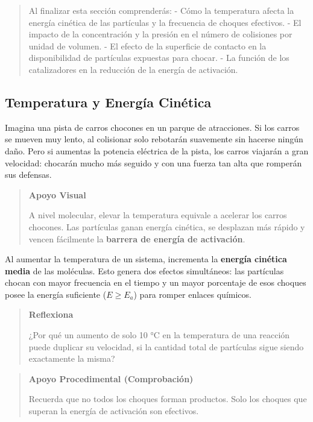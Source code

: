 \documentclass[
  spanish,
  letterpaper,
  12pt,
  oneside,
  open=any,
  DIV=15]{scrbook}
\begin{document}
\begin{tcolorbox}
\begin{quote}
Al finalizar esta sección comprenderás: - Cómo la temperatura afecta la
energía cinética de las partículas y la frecuencia de choques efectivos.
- El impacto de la concentración y la presión en el número de colisiones
por unidad de volumen. - El efecto de la superficie de contacto en la
disponibilidad de partículas expuestas para chocar. - La función de los
catalizadores en la reducción de la energía de activación.
\end{quote}

\subsection{Temperatura y Energía
Cinética}\label{temperatura-y-energuxeda-cinuxe9tica}

Imagina una pista de carros chocones en un parque de atracciones. Si los
carros se mueven muy lento, al colisionar solo rebotarán suavemente sin
hacerse ningún daño. Pero si aumentas la potencia eléctrica de la pista,
los carros viajarán a gran velocidad: chocarán mucho más seguido y con
una fuerza tan alta que romperán sus defensas.

\begin{quote}
\textbf{Apoyo Visual}

A nivel molecular, elevar la temperatura equivale a acelerar los carros
chocones. Las partículas ganan energía cinética, se desplazan más rápido
y vencen fácilmente la \textbf{barrera de energía de activación}.
\end{quote}

Al aumentar la temperatura de un sistema, incrementa la \textbf{energía
cinética media} de las moléculas. Esto genera dos efectos simultáneos:
las partículas chocan con mayor frecuencia en el tiempo y un mayor
porcentaje de esos choques posee la energía suficiente (\(E \ge E_a\))
para romper enlaces químicos.

\begin{quote}
\textbf{Reflexiona}

¿Por qué un aumento de solo 10 °C en la temperatura de una reacción
puede duplicar su velocidad, si la cantidad total de partículas sigue
siendo exactamente la misma?
\end{quote}

\begin{quote}
\textbf{Apoyo Procedimental (Comprobación)}

Recuerda que no todos los choques forman productos. Solo los choques que
superan la energía de activación son efectivos.
\end{quote}


\end{tcolorbox}
\end{document}
